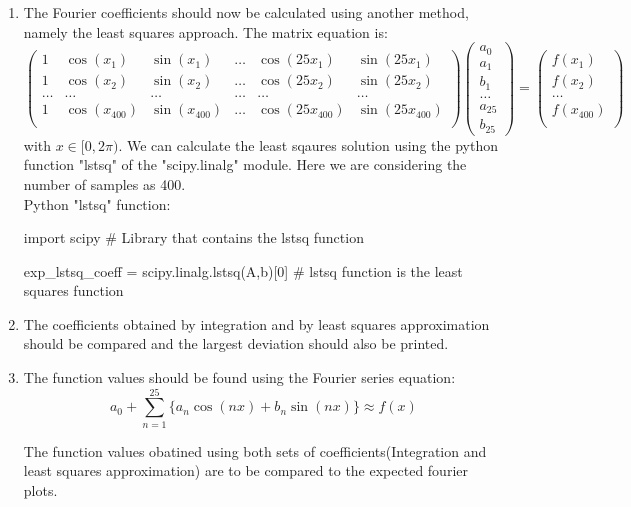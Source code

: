 \documentclass[12pt, a4paper]{article}
\begin{document}
\begin{enumerate}
    \item The Fourier coefficients should now be calculated using another method, namely the least squares approach. The matrix equation is:
    \begin{equation*}
        \begin{pmatrix}
            1 & \cos(x_{1}) & \sin(x_{1}) & \ldots & \cos(25x_{1}) & \sin(25x_{1}) \\
            1 & \cos(x_{2}) & \sin(x_{2}) & \ldots & \cos(25x_{2}) & \sin(25x_{2}) \\
            \ldots & \ldots & \ldots & \ldots & \ldots & \ldots \\
            1 & \cos(x_{400}) & \sin(x_{400}) & \ldots & \cos(25x_{400}) & \sin(25x_{400}) \\
        \end{pmatrix}
        \begin{pmatrix}
            a_{0} \\
            a_{1} \\
            b_{1} \\
            \ldots \\
            a_{25} \\
            b_{25}
        \end{pmatrix}
        =
        \begin{pmatrix}
            f(x_{1}) \\
            f(x_{2}) \\
            \ldots \\
            f(x_{400}) \\
        \end{pmatrix}
    \end{equation*}
with $x \in [0,2\pi )$. We can calculate the least sqaures solution using the python function "lstsq" of the "scipy.linalg" module.
Here we are considering the number of samples as 400.\\

Python "lstsq" function:
\begin{psudo}
    import scipy
    # Library that contains the lstsq function

    exp_lstsq_coeff = scipy.linalg.lstsq(A,b)[0]
    # lstsq function is the least squares function
\end{psudo}

    \item The coefficients obtained by integration and by least squares approximation should be compared and the largest deviation should also be printed.
    \item The function values should be found using the Fourier series equation:
\begin{equation*}
    a_{0}+\sum\limits_{n=1}^{25}  \{a_{n}\cos (nx)+b_{n}\sin (nx)\} \approx f(x)
\end{equation*}

The function values obatined using both sets of coefficients(Integration and least squares approximation) are to be compared to the expected fourier plots.
\end{enumerate}
\end{document}
